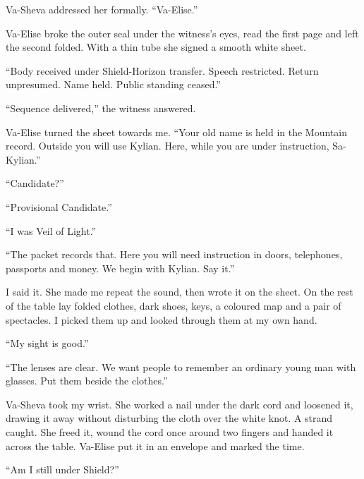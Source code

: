 Va-Sheva addressed her formally. ``Va-Elise.''\par

Va-Elise broke the outer seal under the witness's eyes, read the first page and left the second folded. With a thin tube she signed a smooth white sheet.\par

``Body received under Shield-Horizon transfer. Speech restricted. Return unpresumed. Name held. Public standing ceased.''\par

``Sequence delivered,'' the witness answered.\par

Va-Elise turned the sheet towards me. ``Your old name is held in the Mountain record. Outside you will use Kylian. Here, while you are under instruction, Sa-Kylian.''\par

``Candidate?''\par

``Provisional Candidate.''\par

``I was Veil of Light.''\par

``The packet records that. Here you will need instruction in doors, telephones, passports and money. We begin with Kylian. Say it.''\par

I said it. She made me repeat the sound, then wrote it on the sheet. On the rest of the table lay folded clothes, dark shoes, keys, a coloured map and a pair of spectacles. I picked them up and looked through them at my own hand.\par

``My sight is good.''\par

``The lenses are clear. We want people to remember an ordinary young man with glasses. Put them beside the clothes.''\par

Va-Sheva took my wrist. She worked a nail under the dark cord and loosened it, drawing it away without disturbing the cloth over the white knot. A strand caught. She freed it, wound the cord once around two fingers and handed it across the table. Va-Elise put it in an envelope and marked the time.\par

``Am I still under Shield?''\par

